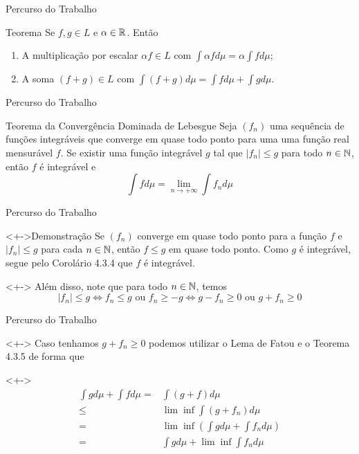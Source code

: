 	\begin{frame}{Percurso do Trabalho}
		\begin{block}{Teorema}
			\justify Se $f, g \in L$ e $\alpha \in \operatorname{\mathbb{R}}$. Então
			\begin{enumerate}[<+->]
				\item A multiplicação por escalar $\alpha f \in L$ com $\displaystyle \int \alpha fd\mu = \alpha \int f d\mu$;
				\item A soma $(f + g) \in L$ com $\displaystyle \int (f + g) d\mu = \int f d\mu + \int g d\mu$. 
			\end{enumerate}
		\end{block}
	\end{frame}

	\begin{frame}{Percurso do Trabalho}
		\begin{block}{Teorema da Convergência Dominada de Lebesgue}
			\justify Seja $(f_n)$ uma sequência de funções integráveis que converge em quase todo ponto para uma uma função real mensurável $f$.
			Se existir uma função integrável $g$ tal que $|f_n| \leq g$ para todo $n \in \operatorname{\mathbb{N}}$, então $f$ é integrável e 
			$$
			\displaystyle \int f d\mu = \lim_{n \to +\infty} \int f_n d\mu
			$$
		\end{block}
	\end{frame}
	
	\begin{frame}{Percurso do Trabalho}
			\begin{block}<+->{Demonstração}
				\justify Se $(f_n)$ converge em quase todo ponto para a função $f$ e $|f_n| \leq g$ para cada $n \in \operatorname{\mathbb{N}}$, então $f \leq g$ em quase todo ponto.
				Como $g$ é integrável, segue pelo Corolário 4.3.4 que $f$ é integrável.
			\end{block}
			\begin{block}<+->{}
				\justify Além disso, note que para todo $n \in \operatorname{\mathbb{N}}$, temos
				$$
				|f_n| \leq g 
				\Leftrightarrow 
				f_n \leq g 
				\textrm{\ ou \ }
				f_n \geq -g
				\Leftrightarrow
				g - f_n \geq 0
				\textrm{\ ou \ }
				g + f_n \geq 0
				$$
			\end{block}
	\end{frame}	
	\begin{frame}{Percurso do Trabalho}
		\begin{block}<+->{}
			Caso tenhamos $g + f_n \geq 0$ podemos utilizar o Lema de Fatou e o Teorema 4.3.5 de forma que 
		\end{block}
		\begin{block}<+->{}
			\begin{align*}
				\int g d\mu + \int f d\mu =& \int (g + f) d\mu \\
				\leq & \lim \inf \int (g + f_n) d\mu \\
				=& \lim \inf \left(\int g d\mu + \int f_n d\mu\right)\\
				=& \int g d\mu + \lim \inf \int f_n d\mu
			\end{align*}
		\end{block}
	\end{frame}
	
